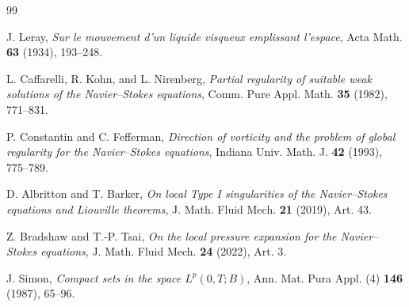 \documentclass[11pt]{article}
\theoremstyle{definition}\newtheorem{problem}[theorem]{Problem}
\theoremstyle{definition}
\theoremstyle{remark}
\begin{document}
\begin{thebibliography}{99}

J. Leray,
\emph{Sur le mouvement d'un liquide visqueux emplissant l'espace},
Acta Math. \textbf{63} (1934), 193--248.

L. Caffarelli, R. Kohn, and L. Nirenberg,
\emph{Partial regularity of suitable weak solutions of the Navier--Stokes equations},
Comm. Pure Appl. Math. \textbf{35} (1982), 771--831.

P. Constantin and C. Fefferman,
\emph{Direction of vorticity and the problem of global regularity for the Navier--Stokes equations},
Indiana Univ. Math. J. \textbf{42} (1993), 775--789.

D. Albritton and T. Barker,
\emph{On local Type I singularities of the Navier--Stokes equations and Liouville theorems},
J. Math. Fluid Mech. \textbf{21} (2019), Art. 43.

Z. Bradshaw and T.-P. Tsai,
\emph{On the local pressure expansion for the Navier--Stokes equations},
J. Math. Fluid Mech. \textbf{24} (2022), Art. 3.

J. Simon,
\emph{Compact sets in the space $L^p(0,T;B)$},
Ann. Mat. Pura Appl. (4) \textbf{146} (1987), 65--96.

\end{thebibliography}
\end{document}
